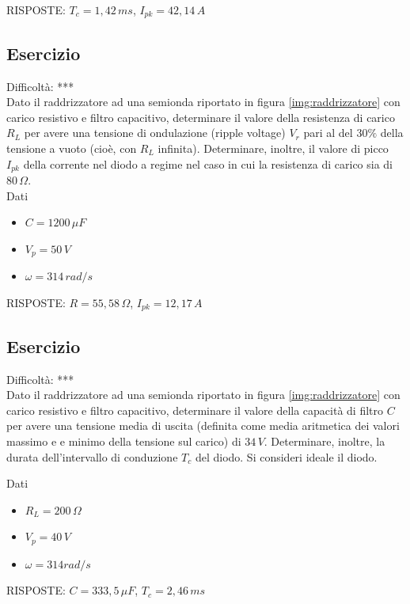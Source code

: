 \documentclass[a4paper,portrait,12pt]{article}
\theoremstyle{definition}
\begin{document}
RISPOSTE: $T_c = 1,42\,ms$, $I_{pk} = 42,14\,A$


\subsection{Esercizio}

Difficoltà: ***\\

Dato il raddrizzatore ad una semionda riportato in figura \ref{img:raddrizzatore} con carico resistivo e 
filtro capacitivo, determinare il valore della resistenza di carico $R_L$ per avere una tensione di 
ondulazione (ripple voltage) $V_r$ pari al del $30\%$ della tensione a vuoto (cioè, con $R_L$ infinita). 
Determinare, inoltre, il valore di picco $I_{pk}$ della corrente nel diodo a regime nel caso in cui la 
resistenza di carico sia di $80\,\Omega$.\\

Dati
\begin{itemize}
\item $C=1200\,\mu F$ 
\item $V_p=50\,V$ 
\item $\omega=314\,rad/s$
\end{itemize}

RISPOSTE: $R = 55,58\,\Omega$, $I_{pk} = 12,17\,A$


\subsection{Esercizio}

Difficoltà: ***\\

Dato il raddrizzatore ad una semionda riportato in figura \ref{img:raddrizzatore} con carico resistivo e 
filtro capacitivo, determinare il valore della capacità di filtro $C$ per avere una tensione media di uscita 
(definita come media aritmetica dei valori massimo e e minimo della tensione sul carico) di $34\,V$. 
Determinare, inoltre, la durata dell'intervallo di conduzione $T_c$ del diodo. Si consideri ideale il diodo.

Dati
\begin{itemize}
\item $R_L=200\,\Omega$
\item $V_p=40\,V$ 
\item $\omega=314rad/s$
\end{itemize}

RISPOSTE: $C=333,5\,\mu F$, $T_c = 2,46\,ms$
\end{document}
